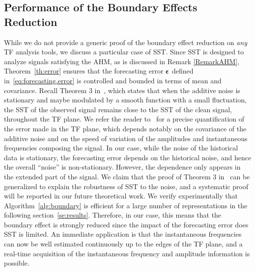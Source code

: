 \subsection{Performance of the Boundary Effects Reduction}
\label{sse:perf.BoundEffRed}
While we do not provide a generic proof of the boundary effect reduction on {\em any} TF analysis tools, we discuss a particular case of SST. Since SST is designed to analyze signals satisfying the AHM, as is discussed in Remark \ref{RemarkAHM}, Theorem~\ref{th:error} ensures that the forecasting error $\boldsymbol{\epsilon}$ defined in~\eqref{eq:forecasting.error} is controlled and bounded in terms of mean and covariance. Recall Theorem 3 in~\cite{Chen14nonparametric}, which states that when the additive noise is stationary and maybe modulated by a smooth function with a small fluctuation, the SST of the observed signal remains close to the SST of the clean signal, throughout the TF plane. 
%
We refer the reader to~\cite{Chen14nonparametric} for a precise quantification of the error made in the TF plane, which depends notably on the covariance of the additive noise and on the speed of variation of the amplitudes and instantaneous frequencies composing the signal. 
%
In our case, while the noise of the historical data is stationary, the forecasting error depends on the historical noise, and hence the overall ``noise'' is non-stationary. However, the dependence only appears in the extended part of the signal. We claim that the proof of Theorem 3 in~\cite{Chen14nonparametric} can be generalized to explain the robustness of SST to the noise, and a systematic proof will be reported in our future theoretical work. We verify experimentally that Algorithm~\ref{alg:boundary} is efficient for a large number of representations in the following section~\ref{se:results}. 
%
Therefore, in our case, this means that the boundary effect is strongly reduced since the impact of the forecasting error does SST is limited. An immediate application is that the instantaneous frequencies can now be well estimated continuously up to the edges of the TF plane, and a real-time acquisition of the instantaneous frequency and amplitude information is possible.